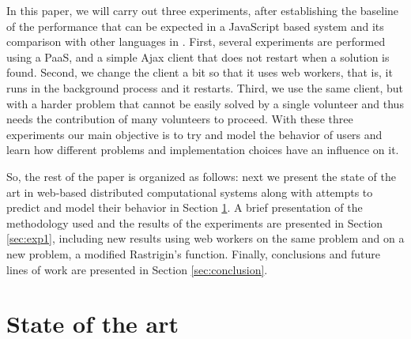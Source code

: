 \documentclass{sig-alternate}
\begin{document}
In this paper, we will carry out three experiments, after establishing
the baseline of the performance that can be expected in a JavaScript
based system and its comparison with other languages in
\cite{2016arXiv160101607Manom}. First, several experiments are performed using a PaaS, and a simple Ajax client that does not
restart when a solution is found. Second, we change the client a bit so that it uses web workers, that is, it runs in the background process and it restarts. Third, we use the same
client, but with a harder problem that cannot be easily solved by a single
volunteer and thus needs the contribution of many volunteers to
proceed. 
With these three experiments our main objective is to try and model
the behavior of users and learn how different problems and implementation choices have an influence on it. 


So, the rest of the paper is organized as follows: next we present the
state of the art in web-based distributed
computational systems along with attempts to predict and model their
behavior in Section \ref{sec:soa}. A brief presentation of the
methodology used and the results of the experiments are presented in
Section \ref{sec:exp1}, including new results using web workers on the
same problem and on a new problem, a modified Rastrigin's function. 
Finally, conclusions and future lines of work are presented in Section
\ref{sec:conclusion}. 

\section{State of the art}
\label{sec:soa}
\end{document}
